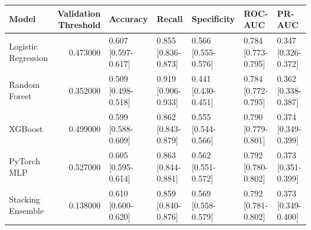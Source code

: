 \begin{tabular}{lrlllll}
\toprule
Model & Validation Threshold & Accuracy & Recall & Specificity & ROC-AUC & PR-AUC \\
\midrule
Logistic Regression & 0.473000 & 0.607 [0.597-0.617] & 0.855 [0.836-0.873] & 0.566 [0.555-0.576] & 0.784 [0.773-0.795] & 0.347 [0.326-0.372] \\
Random Forest & 0.352000 & 0.509 [0.498-0.518] & 0.919 [0.906-0.933] & 0.441 [0.430-0.451] & 0.784 [0.772-0.795] & 0.362 [0.338-0.387] \\
XGBoost & 0.499000 & 0.599 [0.588-0.609] & 0.862 [0.843-0.879] & 0.555 [0.544-0.566] & 0.790 [0.779-0.801] & 0.374 [0.349-0.399] \\
PyTorch MLP & 0.527000 & 0.605 [0.595-0.614] & 0.863 [0.844-0.881] & 0.562 [0.551-0.572] & 0.792 [0.780-0.802] & 0.373 [0.351-0.399] \\
Stacking Ensemble & 0.138000 & 0.610 [0.600-0.620] & 0.859 [0.840-0.876] & 0.569 [0.558-0.579] & 0.792 [0.781-0.802] & 0.373 [0.349-0.400] \\
\bottomrule
\end{tabular}
